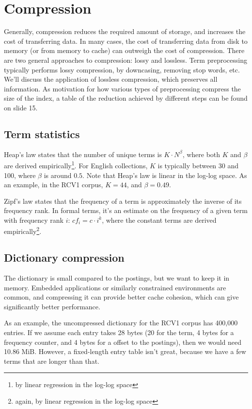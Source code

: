 \documentclass{idc_msc}
\begin{document}
\section{Compression}

Generally, compression reduces the required amount of storage, and increases the cost of transferring data.
In many cases, the cost of transferring data from disk to memory (or from memory to cache) can outweigh the cost of compression.
There are two general approaches to compression: lossy and lossless.
Term preprocessing typically performs lossy compression, by downcasing, removing stop words, etc.
We'll discuss the application of lossless compression, which preserves all information.
As motivation for how various types of preprocessing compress the size of the index, a table of the reduction achieved by different steps can be found on slide 15.

\subsection{Term statistics}

Heap's law states that the number of unique terms is \(K \cdot N^\beta\), where both \(K\) and \(\beta\) are derived empirically\footnote{by linear regression in the log-log space}.
For English collections, \(K\) is typically between 30 and 100, where \(\beta\) is around \(0.5\).
Note that Heap's law is linear in the log-log space.
As an example, in the RCV1 corpus, \(K=44\), and \(\beta = 0.49\).

Zipf's law states that the frequency of a term is approximately the inverse of its frequency rank.
In formal terms, it's an estimate on the frequency of a given term with frequency rank \(i\): \({cf}_i = c \cdot i^k\), where the constant terms are derived empirically\footnote{again, by linear regression in the log-log space}.

\subsection{Dictionary compression}

The dictionary is small compared to the postings, but we want to keep it in memory.
Embedded applications or similarly constrained environments are common, and compressing it can provide better cache cohesion, which can give significantly better performance.

As an example, the uncompressed dictionary for the RCV1 corpus has 400,000 entries.
If we assume each entry takes 28 bytes (20 for the term, 4 bytes for a frequency counter, and 4 bytes for a offset to the postings), then we would need 10.86 MiB.
However, a fixed-length entry table isn't great, because we have a few terms that are longer than that.
\end{document}
